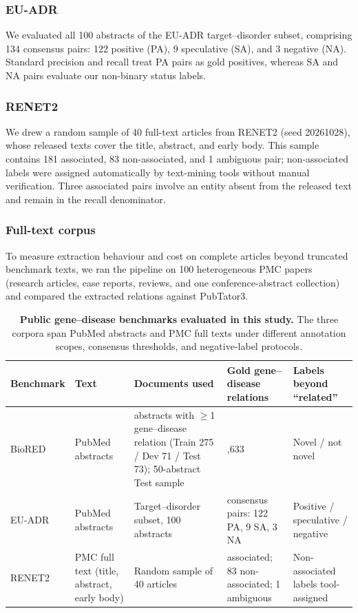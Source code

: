 \documentclass[preprint,10pt,letterpaper]{elsarticle}
\begin{document}
\subsubsection{EU-ADR}
We evaluated all 100 abstracts of the EU-ADR target--disorder subset, comprising 134 consensus pairs: 122 positive (PA), 9 speculative (SA), and 3 negative (NA). Standard precision and recall treat PA pairs as gold positives, whereas SA and NA pairs evaluate our non-binary status labels.

\subsubsection{RENET2}
We drew a random sample of 40 full-text articles from RENET2 (seed 20261028), whose released texts cover the title, abstract, and early body. This sample contains 181 associated, 83 non-associated, and 1 ambiguous pair; non-associated labels were assigned automatically by text-mining tools without manual verification. Three associated pairs involve an entity absent from the released text and remain in the recall denominator.

\subsubsection{Full-text corpus}
To measure extraction behaviour and cost on complete articles beyond truncated benchmark texts, we ran the pipeline on 100 heterogeneous PMC papers (research articles, case reports, reviews, and one conference-abstract collection) and compared the extracted relations against PubTator3.

\begin{table}[!htbp]
\centering\footnotesize
\caption{\textbf{Public gene--disease benchmarks evaluated in this study.} The three corpora span PubMed abstracts and PMC full texts under different annotation scopes, consensus thresholds, and negative-label protocols.}
\label{tab:benchmarks}
\begin{tabularx}{\linewidth}{@{}l>{\raggedright\arraybackslash}p{2.3cm}>{\raggedright\arraybackslash}X>{\raggedright\arraybackslash}p{3.4cm}>{\raggedright\arraybackslash}p{2.6cm}@{}}
\toprule
Benchmark & Text & Documents used & Gold gene--disease relations & Labels beyond ``related''\\
\midrule
BioRED~\cite{luo2022biored} & PubMed abstracts & 419 abstracts with $\geq$1 gene--disease relation (Train 275 / Dev 71 / Test 73); 50-abstract Test sample & 1,633 & Novel / not novel\\
EU-ADR~\cite{vanmulligen2012euadr} & PubMed abstracts & Target--disorder subset, 100 abstracts & 134 consensus pairs: 122 PA, 9 SA, 3 NA & Positive / speculative / negative\\
RENET2~\cite{su2021renet2} & PMC full text (title, abstract, early body) & Random sample of 40 articles & 181 associated; 83 non-associated; 1 ambiguous & Non-associated labels tool-assigned\\
\bottomrule
\end{tabularx}
\end{table}
\end{document}
